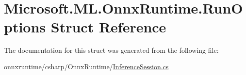 \hypertarget{structMicrosoft_1_1ML_1_1OnnxRuntime_1_1RunOptions}{}\section{Microsoft.\+M\+L.\+Onnx\+Runtime.\+Run\+Options Struct Reference}
\label{structMicrosoft_1_1ML_1_1OnnxRuntime_1_1RunOptions}


The documentation for this struct was generated from the following file\+:\begin{DoxyCompactItemize}
\item 
onnxruntime/csharp/\+Onnx\+Runtime/\mbox{\hyperlink{InferenceSession_8cs}{Inference\+Session.\+cs}}\end{DoxyCompactItemize}
